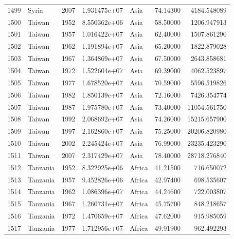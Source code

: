 \documentclass[
  letterpaper,
  DIV=11,
  numbers=noendperiod]{scrreprt}
\begin{document}
\begin{tabular}{llrrlrr}
1499 &                     Syria &  2007 &  1.931475e+07 &      Asia &  74.14300 &    4184.548089 \\
1500 &                    Taiwan &  1952 &  8.550362e+06 &      Asia &  58.50000 &    1206.947913 \\
1501 &                    Taiwan &  1957 &  1.016422e+07 &      Asia &  62.40000 &    1507.861290 \\
1502 &                    Taiwan &  1962 &  1.191894e+07 &      Asia &  65.20000 &    1822.879028 \\
1503 &                    Taiwan &  1967 &  1.364869e+07 &      Asia &  67.50000 &    2643.858681 \\
1504 &                    Taiwan &  1972 &  1.522604e+07 &      Asia &  69.39000 &    4062.523897 \\
1505 &                    Taiwan &  1977 &  1.678520e+07 &      Asia &  70.59000 &    5596.519826 \\
1506 &                    Taiwan &  1982 &  1.850139e+07 &      Asia &  72.16000 &    7426.354774 \\
1507 &                    Taiwan &  1987 &  1.975780e+07 &      Asia &  73.40000 &   11054.561750 \\
1508 &                    Taiwan &  1992 &  2.068692e+07 &      Asia &  74.26000 &   15215.657900 \\
1509 &                    Taiwan &  1997 &  2.162860e+07 &      Asia &  75.25000 &   20206.820980 \\
1510 &                    Taiwan &  2002 &  2.245424e+07 &      Asia &  76.99000 &   23235.423290 \\
1511 &                    Taiwan &  2007 &  2.317429e+07 &      Asia &  78.40000 &   28718.276840 \\
1512 &                  Tanzania &  1952 &  8.322925e+06 &    Africa &  41.21500 &     716.650072 \\
1513 &                  Tanzania &  1957 &  9.452826e+06 &    Africa &  42.97400 &     698.535607 \\
1514 &                  Tanzania &  1962 &  1.086396e+07 &    Africa &  44.24600 &     722.003807 \\
1515 &                  Tanzania &  1967 &  1.260731e+07 &    Africa &  45.75700 &     848.218657 \\
1516 &                  Tanzania &  1972 &  1.470659e+07 &    Africa &  47.62000 &     915.985059 \\
1517 &                  Tanzania &  1977 &  1.712956e+07 &    Africa &  49.91900 &     962.492293 \\

\end{tabular}
\end{document}

